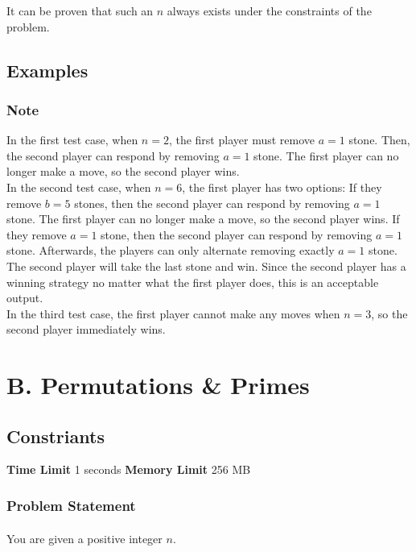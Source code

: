 \documentclass{article}
\begin{document}
It can be proven that such an $n$ always exists under the constraints of the problem.
\subsection*{Examples}
\subsubsection*{Note}In the first test case, when $n = 2$, the first player must remove $a = 1$ stone. Then, the second player can respond by removing $a = 1$ stone. The first player can no longer make a move, so the second player wins.\\ In the second test case, when $n = 6$, the first player has two options:   If they remove $b = 5$ stones, then the second player can respond by removing $a = 1$ stone. The first player can no longer make a move, so the second player wins.  If they remove $a = 1$ stone, then the second player can respond by removing $a = 1$ stone. Afterwards, the players can only alternate removing exactly $a = 1$ stone. The second player will take the last stone and win.  Since the second player has a winning strategy no matter what the first player does, this is an acceptable output.\\ In the third test case, the first player cannot make any moves when $n = 3$, so the second player immediately wins.
\newpage
\section*{B. Permutations & Primes}
\subsection*{Constriants}
\textbf{Time Limit}
1 seconds
\hfill
\textbf{Memory Limit}
256 MB
\subsubsection*{Problem Statement}
\paragraph{}You are given a positive integer $n$.
\end{document}
